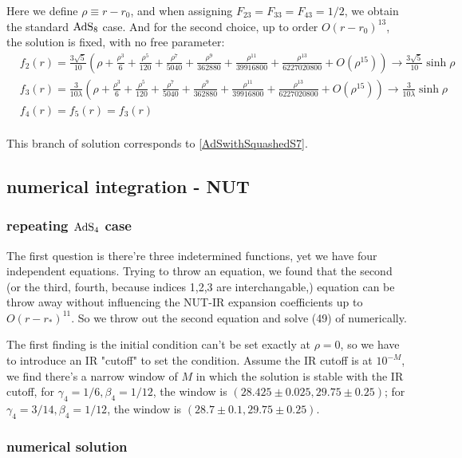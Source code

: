 \documentclass[12pt, a4paper]{article}
\numberwithin{equation}{section}
\newcommand{\be}{\begin{equation}}
\newcommand{\ee}{\end{equation}}
\begin{document}
	Here we define $\rho \equiv r - r_0$, and when assigning $F_{23} = F_{33} = F_{43} = 1/2$, we obtain the standard ${\rm AdS_8}$ case. And for the second choice, up to order $O(r-r_0)^{13}$, the solution is fixed, with no free parameter:
\be
	\begin{aligned}
			&f_2(r) = \frac{3\sqrt{5}}{10}\left(\rho +\frac{\rho ^3}{6}+\frac{\rho ^5}{120}+\frac{\rho ^7}{5040}+\frac{\rho ^9}{362880}+\frac{\rho ^{11}}{39916800}+\frac{\rho ^{13}}{6227020800}+O\left(\rho ^{15}\right)\right) \rightarrow  \frac{3\sqrt{5}}{10}\sinh\rho &\\
			&f_3(r)  = \frac{3}{10\lambda}\left(\rho +\frac{\rho ^3}{6}+\frac{\rho ^5}{120}+\frac{\rho ^7}{5040}+\frac{\rho ^9}{362880}+\frac{\rho ^{11}}{39916800}+\frac{\rho ^{13}}{6227020800}+O\left(\rho ^{15}\right)\right)\rightarrow \frac{3}{10\lambda}\sinh\rho&\\	
			&f_4(r) = f_5(r) = f_3(r)&\\
	\end{aligned}
\label{branch1ansatz2IR}
\ee
	
	This branch of solution corresponds to \ref{AdSwithSquashedS7}.
	
\subsection{numerical integration - NUT}
\subsubsection{repeating ${\rm AdS_4}$ case}
The first question is there're three indetermined functions, yet we have four independent equations. Trying to throw an equation, we found that the second (or the third, fourth, because indices 1,2,3 are interchangable,) equation can be throw away without influencing the NUT-IR expansion coefficients up to $O(r-r_*)^{11}$. So we throw out the second equation and solve (49) of \cite{Bobev:2016sh} numerically. 

The first finding is the initial condition can't be set exactly at $\rho = 0$, so we have to introduce an IR "cutoff" to set the condition. Assume the IR cutoff is at $10^{-M}$, we find there's a narrow window of $M$ in which the solution is stable with the IR cutoff, for $\gamma_4 = 1/6, \beta_4 = 1/12$, the window is $(28.425\pm0.025,29.75\pm 0.25)$; for $\gamma_4 = 3/14, \beta_4 = 1/12$, the window is $(28.7\pm0.1, 29.75\pm 0.25)$.

\subsubsection{numerical solution}
\end{document}
